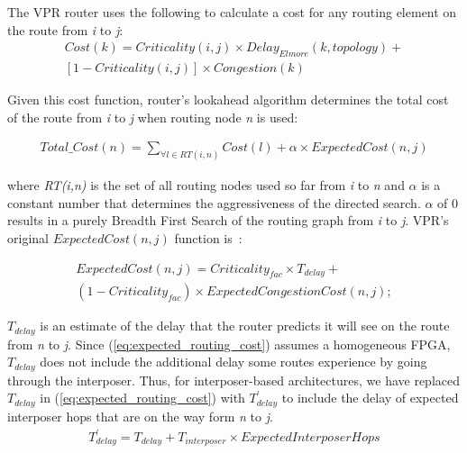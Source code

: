 \documentclass{sig-alternate-2013}
\begin{document}
The VPR router uses the following to calculate a cost for any routing element on the route from \textit{i} to \textit{j}:
\begin{equation} \label{eq:routing_cost}
\begin{split}
Cost(k) = Criticality(i,j) \times Delay_{Elmore}(k, topology) + \\ [1-Criticality(i,j)] \times Congestion(k)
\end{split}
\end{equation}

Given this cost function, router's lookahead algorithm determines the total cost of the route from \textit{i} to \textit{j} when routing node \textit{n} is used:

\begin{equation} \label{eq:lookahead_cost}
\begin{split}
Total\_Cost(n) = \sum_{\forall l \in RT(i,n)} Cost(l) + \alpha \times ExpectedCost(n,j)
\end{split}
\end{equation}

where \textit{RT(i,n)} is the set of all routing nodes used so far from \textit{i} to \textit{n} and $\alpha$ is a constant number that determines the aggressiveness of the directed search. $\alpha$ of 0 results in a purely Breadth First Search of the routing graph from \textit{i} to \textit{j}. VPR's original $ExpectedCost(n,j)$ function is~\cite{betz1997vpr}: 

\begin{equation} \label{eq:expected_routing_cost}
\begin{split}
ExpectedCost(n,j) = Criticality_{fac} \times T_{delay} + \\(1 - Criticality_{fac}) \times ExpectedCongestionCost(n,j);
\end{split}
\end{equation}

$T_{delay}$ is an estimate of the delay that the router predicts it will see on the route from \textit{n} to \textit{j}. Since (\ref{eq:expected_routing_cost}) assumes a homogeneous FPGA, $T_{delay}$ does not include the additional delay some routes experience by going through the interposer. Thus, for interposer-based architectures, we have replaced $T_{delay}$ in (\ref{eq:expected_routing_cost}) with $T^\prime_{delay}$ to include the delay of expected interposer hops that are on the way form \textit{n} to \textit{j}.
\begin{equation} \label{eq:tdelay}
\begin{split}
T^\prime_{delay} = T_{delay} + T_{interposer} \times ExpectedInterposerHops
\end{split}
\end{equation}
\end{document}
